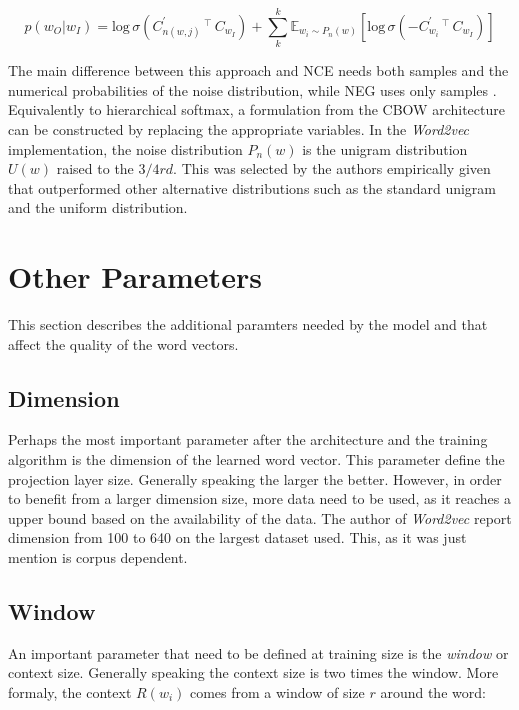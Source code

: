 \begin{equation}
  p(w_O|w_I)  =  \text{log}\,\sigma\left(C^{'}_{n(w,j)}  \,^\top\, C_{w_I}
  \right) + \sum^{k}_k\mathbb{E}_{w_{i}\sim P_{n}(w)}\left[
    \text{log}\,\sigma\left(-C^{'}_{w_i}  \,^\top\,  C_{w_I} \right)  \right]
\end{equation}

The main difference between this approach and \ac{NCE}  needs both
samples and the numerical probabilities of the noise distribution, while \ac{NEG} uses only
samples \cite{MikolovSCCD13}.  Equivalently to  hierarchical softmax, a formulation from  the \ac{CBOW}
 architecture can be constructed by replacing the appropriate variables.
In the \textit{Word2vec} implementation, the
noise distribution  $P_n(w)$ is the unigram distribution $U(w)$ raised to the
$3/4rd$. This was selected by the authors empirically given that outperformed
other alternative distributions such as the standard unigram and the uniform
distribution. 



\section{Other Parameters}
\label{sec:w2v_other_paramters}
This section describes the additional paramters needed by the model and that
affect the quality of the word vectors.


\subsection{Dimension }
\label{sec:w2v-param-dim}
Perhaps the most important parameter after the architecture and the training
algorithm is the dimension of the learned word vector.  This parameter define
the projection layer size. Generally speaking the larger the better.
However, in order to benefit from a larger dimension size, more data need to
be used, as it  reaches a upper bound based on the availability of the data.
The author of \textit{Word2vec} report dimension from 100 to 640 on the
largest dataset used. This, as it was just mention is corpus dependent.


\subsection{Window}
\label{sec:w2v-params-win}

An important parameter that need to be defined at training size is the
\textit{window} or context size. Generally speaking the context size is two
times the window. More formaly, the context $R(w_i)$ comes from a window of
size $r$ around the word:

